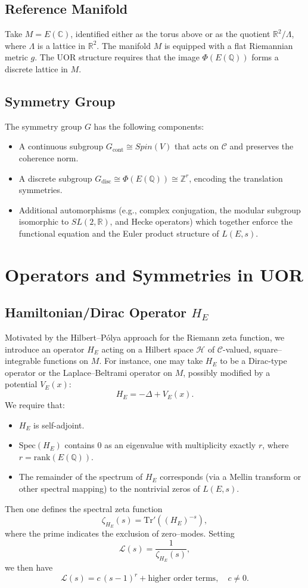 \documentclass[11pt]{article}
\begin{document}
\subsection{Reference Manifold}
Take $M = E(\mathbb{C})$, identified either as the torus above or as the quotient $\mathbb{R}^2/\Lambda$, where $\Lambda$ is a lattice in $\mathbb{R}^2$. The manifold $M$ is equipped with a flat Riemannian metric $g$. The UOR structure requires that the image $\Phi(E(\mathbb{Q}))$ forms a discrete lattice in $M$.

\subsection{Symmetry Group}
The symmetry group $G$ has the following components:
\begin{itemize}
  \item A continuous subgroup $G_{\mathrm{cont}} \cong Spin(V)$ that acts on $\mathcal{C}$ and preserves the coherence norm.
  \item A discrete subgroup $G_{\mathrm{disc}} \cong \Phi(E(\mathbb{Q})) \cong \mathbb{Z}^r$, encoding the translation symmetries.
  \item Additional automorphisms (e.g., complex conjugation, the modular subgroup isomorphic to $SL(2,\mathbb{R})$, and Hecke operators) which together enforce the functional equation and the Euler product structure of $L(E,s)$.
\end{itemize}

\section{Operators and Symmetries in UOR}

\subsection{Hamiltonian/Dirac Operator $H_E$}
Motivated by the Hilbert--Pólya approach for the Riemann zeta function, we introduce an operator $H_E$ acting on a Hilbert space $\mathcal{H}$ of $\mathcal{C}$-valued, square--integrable functions on $M$. For instance, one may take $H_E$ to be a Dirac-type operator or the Laplace--Beltrami operator on $M$, possibly modified by a potential $V_E(x)$:
\[
H_E = -\Delta + V_E(x).
\]
We require that:
\begin{itemize}
  \item $H_E$ is self-adjoint.
  \item $\mathrm{Spec}(H_E)$ contains $0$ as an eigenvalue with multiplicity exactly $r$, where $r = \mathrm{rank}(E(\mathbb{Q}))$.
  \item The remainder of the spectrum of $H_E$ corresponds (via a Mellin transform or other spectral mapping) to the nontrivial zeros of $L(E,s)$.
\end{itemize}
Then one defines the spectral zeta function
\[
\zeta_{H_E}(s) = \mathrm{Tr}'\left( (H_E)^{-s} \right),
\]
where the prime indicates the exclusion of zero--modes. Setting
\[
\mathcal{L}(s) = \frac{1}{\zeta_{H_E}(s)},
\]
we then have
\[
\mathcal{L}(s) = c\,(s-1)^r + \text{higher order terms}, \quad c\neq 0.
\]
\end{document}
